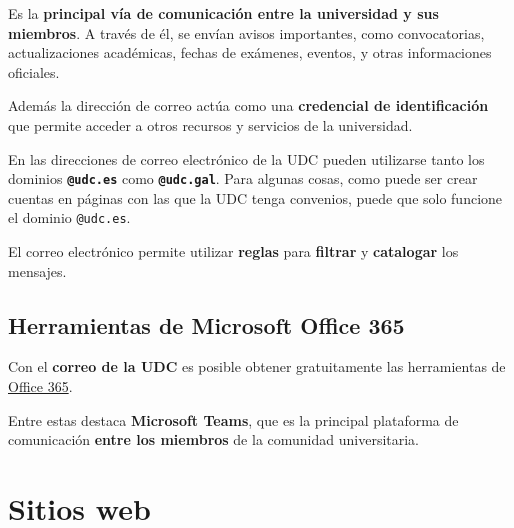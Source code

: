 Es la \textbf{principal vía de comunicación entre la universidad y sus miembros}. A través de él, se envían avisos importantes, como convocatorias, actualizaciones académicas, fechas de exámenes, eventos, y otras informaciones oficiales.

Además la dirección de correo actúa como una \textbf{credencial de identificación} que permite acceder a otros recursos y servicios de la universidad.

\begin{curiosityBox}
    En las direcciones de correo electrónico de la \acrshort{UDC} pueden utilizarse tanto los dominios \textbf{\texttt{@udc.es}} como \textbf{\texttt{@udc.gal}}. Para algunas cosas, como puede ser crear cuentas en páginas con las que la UDC tenga convenios, puede que solo funcione el dominio \texttt{@udc.es}.
\end{curiosityBox}

\begin{rememberBox}
    El correo electrónico permite utilizar \textbf{reglas} para \textbf{filtrar} y \textbf{catalogar} los mensajes. 
\end{rememberBox}

\subsection{Herramientas de Microsoft Office 365}

Con el \textbf{correo de la \acrshort{UDC}} es posible obtener gratuitamente las herramientas de \href{https://www.office.com/}{Office 365}.

\FloatBarrier
\begin{figure}[htp]
    \centering
\end{figure}
\FloatBarrier

Entre estas destaca \textbf{Microsoft Teams}, que es la principal plataforma de comunicación \textbf{entre los miembros} de la comunidad universitaria.


\section{Sitios web}

